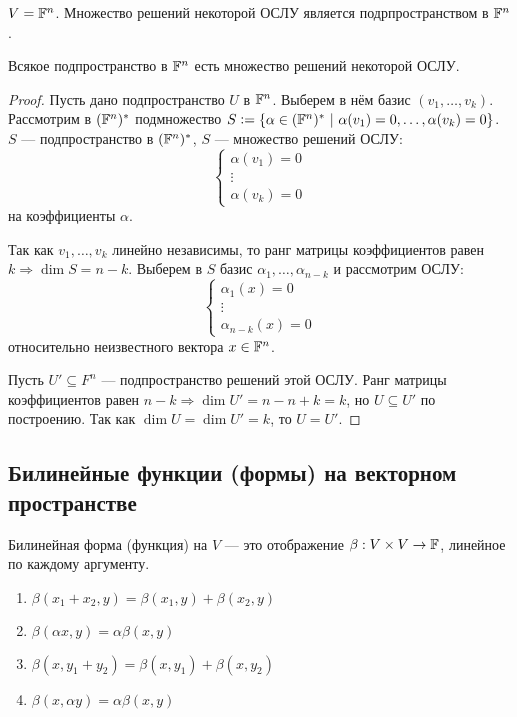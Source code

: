 \begin{Statement}
  $V = \mathbb{F}^n$. Множество решений некоторой ОСЛУ является подрпространством в $\mathbb{F}^n$.
\end{Statement}

\begin{Theorem}
  Всякое подпространство в $\mathbb{F}^n$ есть множество решений некоторой ОСЛУ.
\end{Theorem}
\begin{proof}
  Пусть дано подпространство $U$ в $\mathbb{F}^n$. Выберем в нём базис $(v_1, \ldots, v_k)$. Рассмотрим в $(\mathbb{F}^n)^*$ подмножество $S \defeq \{\alpha \in (\F^n)^*\ |\ \alpha(v_1) = 0, \ldots, \alpha(v_k) = 0\}$. $S$ --- подпространство в $(\mathbb{F}^n)^*$, $S$ --- множество решений ОСЛУ:
  \begin{equation}
    \begin{cases}
      \alpha(v_1) = 0 \\
      \vdots \\
      \alpha(v_k) = 0
    \end{cases}
  \end{equation}
  на коэффициенты $\alpha$.

  Так как $v_1, \ldots, v_k$ линейно независимы, то ранг матрицы коэффициентов равен $k \Rightarrow \dim S = n - k$. Выберем в $S$ базис $\alpha_1, \ldots, \alpha_{n - k}$ и рассмотрим ОСЛУ:
  \begin{equation}
    \begin{cases}
      \alpha_1(x) = 0 \\
      \vdots \\
      \alpha_{n - k}(x) = 0
    \end{cases}
  \end{equation}
  относительно неизвестного вектора $x \in \mathbb{F}^n$.

  Пусть $U' \subseteq F^n$ --- подпространство решений этой ОСЛУ. Ранг матрицы коэффициентов равен $n - k \Rightarrow \dim U' = n - n + k = k$, но $U \subseteq U'$ по построению. Так как $\dim U = \dim U' = k$, то $U = U'$.
\end{proof}

\subsection*{Билинейные функции (формы) на векторном пространстве}
%
\begin{Def}
  Билинейная форма (функция) на $V$ --- это отображение $\beta: V \times V \rightarrow \mathbb{F}$, линейное по каждому аргументу.
  \begin{enumerate}
    \item $\beta(x_1 + x_2, y) = \beta(x_1, y) + \beta(x_2, y)$
    \item $\beta(\alpha x, y) = \alpha \beta(x, y)$
    \item $\beta(x, y_1 + y_2) = \beta(x, y_1) + \beta(x, y_2)$
    \item $\beta(x, \alpha y) = \alpha \beta(x, y)$
  \end{enumerate}
\end{Def}

